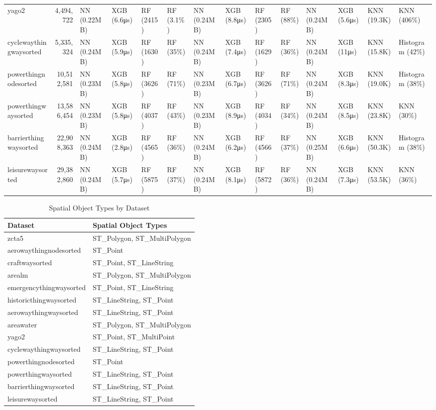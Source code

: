 \begin{table}
{\begin{tabular}{l|r|l|l|l|l|l|l|l|l|l|l|l|l}
yago2 & 4,494,722 & NN (0.22MB) & XGB (6.6μs) & RF (2415) & RF (3.1\%) & NN (0.24MB) & XGB (8.8μs) & RF (2305) & RF (88\%) & NN (0.24MB) & XGB (5.6μs) & KNN (19.3K) & KNN (406\%) \\
cyclewaythingwaysorted & 5,335,324 & NN (0.24MB) & XGB (5.9μs) & RF (1630) & RF (35\%) & NN (0.24MB) & XGB (7.4μs) & RF (1629) & RF (36\%) & NN (0.24MB) & XGB (11μs) & KNN (15.8K) & Histogram (42\%) \\
powerthingnodesorted & 10,512,581 & NN (0.23MB) & XGB (5.8μs) & RF (3626) & RF (71\%) & NN (0.23MB) & XGB (6.7μs) & RF (3626) & RF (71\%) & NN (0.24MB) & XGB (8.3μs) & KNN (19.0K) & Histogram (38\%) \\
powerthingwaysorted & 13,586,454 & NN (0.23MB) & XGB (5.8μs) & RF (4037) & RF (43\%) & NN (0.23MB) & XGB (8.9μs) & RF (4034) & RF (34\%) & NN (0.24MB) & XGB (8.5μs) & KNN (23.8K) & KNN (30\%) \\
barrierthingwaysorted & 22,908,363 & NN (0.24MB) & XGB (2.8μs) & RF (4565) & RF (36\%) & NN (0.24MB) & XGB (6.2μs) & RF (4566) & RF (37\%) & NN (0.25MB) & XGB (6.6μs) & KNN (50.3K) & Histogram (38\%) \\
leisurewaysorted & 29,382,860 & NN (0.24MB) & XGB (5.7μs) & RF (5875) & RF (37\%) & NN (0.24MB) & XGB (8.1μs) & RF (5872) & RF (36\%) & NN (0.24MB) & XGB (7.3μs) & KNN (53.5K) & KNN (36\%) \\
\bottomrule
\end{tabular}}
\end{table}

\begin{table}
\centering
\caption{Spatial Object Types by Dataset}
\label{tab:spatial-object-types}
\begin{tabular}{l|l}
\toprule
Dataset & Spatial Object Types \\
\midrule
zcta5 & ST\_Polygon, ST\_MultiPolygon \\
aerowaythingnodesorted & ST\_Point \\
craftwaysorted & ST\_Point, ST\_LineString \\
arealm & ST\_Polygon, ST\_MultiPolygon \\
emergencythingwaysorted & ST\_Point, ST\_LineString \\
historicthingwaysorted & ST\_LineString, ST\_Point \\
aerowaythingwaysorted & ST\_LineString, ST\_Point \\
areawater & ST\_Polygon, ST\_MultiPolygon \\
yago2 & ST\_Point, ST\_MultiPoint \\
cyclewaythingwaysorted & ST\_LineString, ST\_Point \\
powerthingnodesorted & ST\_Point \\
powerthingwaysorted & ST\_LineString, ST\_Point \\
barrierthingwaysorted & ST\_LineString, ST\_Point \\
leisurewaysorted & ST\_LineString, ST\_Point \\
\bottomrule
\end{tabular}
\end{table}
